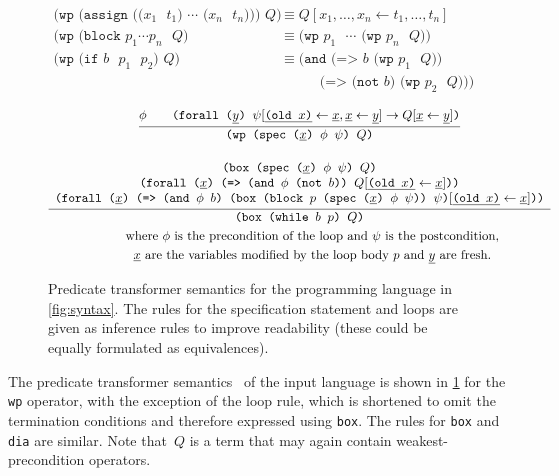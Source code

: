\documentclass[fleqn]{llncs}
\newcommand{\code}[1]{\texttt{#1}}
\newcommand{\xs}{\underline x}
\newcommand{\ys}{\underline y}
\begin{document}
\begin{figure}[t]
    \begin{align*}
\code{(wp (assign (($x_1$ $t_1$) $\cdots$ ($x_n$ $t_n$))) $Q$)}
    & \equiv Q[x_1,\ldots,x_n \gets t_1,\ldots,t_n]
    \\
\code{(wp (block $p_1 \cdots p_n$ $Q$)}
    & \equiv \code{(wp $p_1$ $\cdots$ (wp $p_n$ $Q$))}
    \\
\code{(wp (if $b$ $p_1$ $p_2$) $Q$)}
    & \equiv        \code{(and (=> $b$ (wp $p_1$ $Q$))} \\
    & \hspace{30pt} \code{     (=> (not $b$) (wp $p_2$ $Q$)))}
    \end{align*}

    \begin{gather*}
\infer{\code{(wp (spec ($\xs$) $\phi$ $\psi$) $Q$)}}
{   \phi
 && \code{(forall ($\ys$) $\psi[\underline{\code{(old $x$)}} \gets \xs, \xs \gets \ys]
                            \to Q[\xs \gets \ys]$)}
              }
    \\[1em]
\infer{\code{(box (while $b$ $p$) $Q$)}}
{   
\begin{array}{c}
   \code{(box (spec ($\xs$) $\phi$ $\psi$) $Q$)} \\
   \code{(forall ($\xs$) (=> (and $\phi$ (not $b$)) $Q[\underline{\code{(old $x$)}} \gets \xs]$))} \\
   \code{(forall ($\xs$) (=> (and $\phi$ $b$) (box (block $p$ (spec ($\xs$) $\phi$ $\psi$)) $\psi$)$[\underline{\code{(old $x$)}} \gets \xs]$))}
\end{array}}
    \\
        \qquad \text{where $\phi$ is the precondition of the loop and $\psi$ is the postcondition,} \\
        \qquad \text{$\xs$ are the variables modified by the loop body~$p$ and $\ys$ are fresh.}
    \end{gather*}
    \caption{Predicate transformer semantics for the programming language in \cref{fig:syntax}.
             The rules for the specification statement and loops are given as inference rules
             to improve readability (these could be equally formulated as equivalences).}
    \label{fig:semantics}
\end{figure}

The predicate transformer semantics~\cite{manes2004predicate} of the input language is shown in \cref{fig:semantics} for the \code{wp} operator,
with the exception of the loop rule, which is shortened to omit the termination conditions
and therefore expressed using \code{box}. The rules for \code{box} and \code{dia} are similar.
Note that~$Q$ is a term that may again contain weakest-precondition operators.
\end{document}
